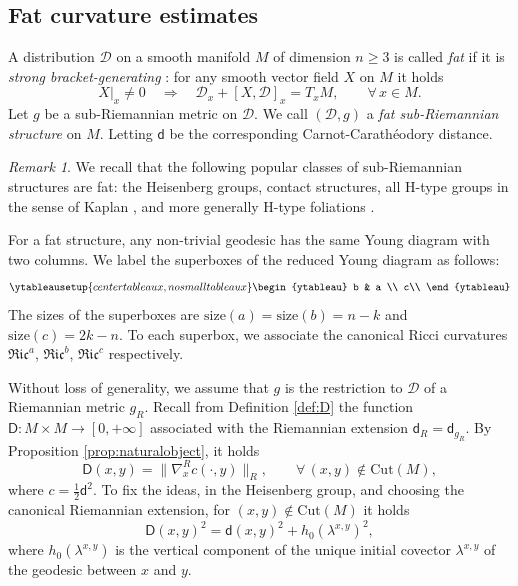 \documentclass[11pt,a4paper]{article}
\theoremstyle{plain}
\theoremstyle{definition}
\theoremstyle{remark}
\newtheorem{remark}[theorem]{Remark}
\numberwithin{equation}{section}
\newcommand{\size}{\mathrm{size}}
\newcommand{\distr}{\mathscr{D}}
\newcommand{\sfd}{\mathsf d}
\newcommand{\sfD}{\mathsf D}
\begin{document}
\subsection{Fat curvature estimates}


A distribution $\distr$ on a smooth manifold $M$ of dimension $n\geq 3$ is called \emph{fat} if it is \emph{strong bracket-generating} \cite{Strichartz,montgomerybook}: for any smooth vector field $X$ on $M$ it holds
\begin{equation}\label{eq:fat-definition}
X|_x \neq 0 \quad \Longrightarrow \quad \distr_x + [X,\distr]_x = T_x M, \qquad \forall\, x\in M.
\end{equation}
Let $g$ be a sub-Riemannian metric on $\distr$.  We call $(\distr,g)$ a \emph{fat sub-Riemannian structure} on $M$. Letting $\sfd$ be the corresponding Carnot-Carathéodory distance. 

 \begin{remark}
We recall that the following popular classes of sub-Riemannian structures are fat: the Heisenberg groups, contact structures, all H-type groups in the sense of Kaplan \cite{Kaplan}, and more generally H-type foliations \cite{BGMR-Htype2}.
\end{remark}


For a fat structure, any non-trivial geodesic has the same Young diagram with two columns.  We label the superboxes of the reduced Young diagram as follows:
\[
\ytableausetup{centertableaux,nosmalltableaux}
\begin{ytableau}
b & a \\
c\\
\end{ytableau}
\]
The sizes of the superboxes are $\size(a)=\size(b) =n-k$ and $\size(c)= 2k-n$. To each superbox, we associate the canonical Ricci curvatures $\mathfrak{Ric}^a$, $\mathfrak{Ric}^b$, $\mathfrak{Ric}^c$ respectively.

Without loss of generality, we assume that $g$ is the restriction to $\distr$ of a Riemannian metric $g_R$. Recall from Definition \ref{def:D} the function $\sfD:M\times M \to [0,+\infty]$ associated with the Riemannian extension $\sfd_{R}=\sfd_{g_R}$. By Proposition \ref{prop:naturalobject}, it holds
\begin{equation}
\sfD(x,y) = \|\nabla^R_x c(\cdot,y)\|_R, \qquad \forall\, (x,y) \notin \mathrm{Cut}(M),
\end{equation}
where $c =\tfrac{1}{2}\sfd^2$. To fix the ideas, in the Heisenberg group, and choosing the canonical Riemannian extension, for $(x,y)\notin \mathrm{Cut}(M)$ it holds
\begin{equation}
\sfD(x,y)^2 = \sfd(x,y)^2 + h_0(\lambda^{x,y})^2,
\end{equation}
where $h_0(\lambda^{x,y})$ is the vertical component of the unique initial covector $\lambda^{x,y}$ of the geodesic between $x$ and $y$.
\end{document}
